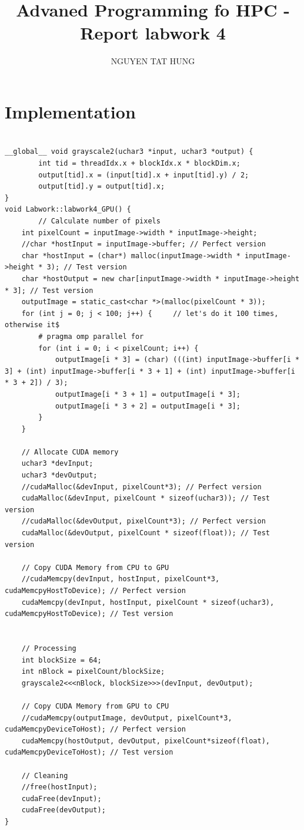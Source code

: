 \documentclass{article}
\title{Advaned Programming fo HPC - Report labwork 4}
\author{NGUYEN TAT HUNG}
\begin{document}
\maketitle

\section*{Implementation}
\begin{lstlisting}

__global__ void grayscale2(uchar3 *input, uchar3 *output) {
        int tid = threadIdx.x + blockIdx.x * blockDim.x;
        output[tid].x = (input[tid].x + input[tid].y) / 2;
        output[tid].y = output[tid].x;
}
void Labwork::labwork4_GPU() {
        // Calculate number of pixels
    int pixelCount = inputImage->width * inputImage->height;
    //char *hostInput = inputImage->buffer; // Perfect version
    char *hostInput = (char*) malloc(inputImage->width * inputImage->height * 3); // Test version
    char *hostOutput = new char[inputImage->width * inputImage->height * 3]; // Test version
    outputImage = static_cast<char *>(malloc(pixelCount * 3));
    for (int j = 0; j < 100; j++) {     // let's do it 100 times, otherwise it$
        # pragma omp parallel for
        for (int i = 0; i < pixelCount; i++) {
            outputImage[i * 3] = (char) (((int) inputImage->buffer[i * 3] + (int) inputImage->buffer[i * 3 + 1] + (int) inputImage->buffer[i * 3 + 2]) / 3);
            outputImage[i * 3 + 1] = outputImage[i * 3];
            outputImage[i * 3 + 2] = outputImage[i * 3];
        }
    }

    // Allocate CUDA memory
    uchar3 *devInput;
    uchar3 *devOutput;
    //cudaMalloc(&devInput, pixelCount*3); // Perfect version
    cudaMalloc(&devInput, pixelCount * sizeof(uchar3)); // Test version
    //cudaMalloc(&devOutput, pixelCount*3); // Perfect version
    cudaMalloc(&devOutput, pixelCount * sizeof(float)); // Test version
    
    // Copy CUDA Memory from CPU to GPU
    //cudaMemcpy(devInput, hostInput, pixelCount*3, cudaMemcpyHostToDevice); // Perfect version
    cudaMemcpy(devInput, hostInput, pixelCount * sizeof(uchar3), cudaMemcpyHostToDevice); // Test version


    // Processing
    int blockSize = 64;
    int nBlock = pixelCount/blockSize;
    grayscale2<<<nBlock, blockSize>>>(devInput, devOutput);

    // Copy CUDA Memory from GPU to CPU
    //cudaMemcpy(outputImage, devOutput, pixelCount*3, cudaMemcpyDeviceToHost); // Perfect version
    cudaMemcpy(hostOutput, devOutput, pixelCount*sizeof(float), cudaMemcpyDeviceToHost); // Test version

    // Cleaning
    //free(hostInput);
    cudaFree(devInput);
    cudaFree(devOutput);
}

\end{lstlisting}
\end{document}
